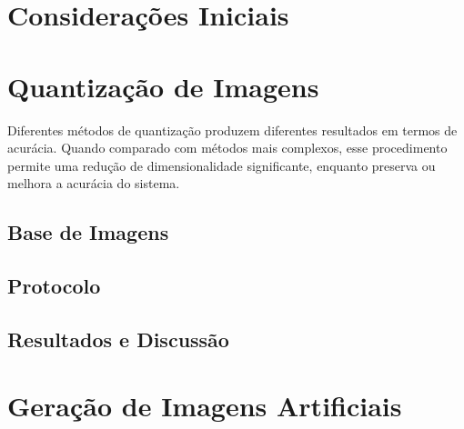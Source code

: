 %

\section{Considerações Iniciais}


\section{Quantização de Imagens}

Diferentes métodos de quantização produzem diferentes resultados em termos de acurácia. Quando comparado com métodos mais complexos, esse procedimento permite uma redução de dimensionalidade significante, enquanto preserva ou melhora a acurácia do sistema.


\subsection{Base de Imagens}

\subsection{Protocolo}



\subsection{Resultados e Discussão}




\section{Geração de Imagens Artificiais}

